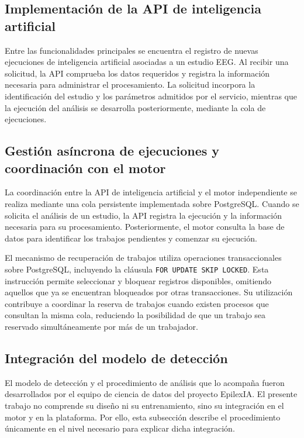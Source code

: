 \subsection{Implementación de la API de inteligencia artificial}

Entre las funcionalidades principales se
encuentra el registro de nuevas ejecuciones
de inteligencia artificial asociadas a un
estudio EEG. Al recibir una solicitud, la API
comprueba los datos requeridos y registra
la información necesaria para administrar
el procesamiento. La solicitud incorpora
la identificación del estudio y los parámetros
admitidos por el servicio, mientras que
la ejecución del análisis se desarrolla
posteriormente, mediante la cola de ejecuciones.

\subsection{Gestión asíncrona de ejecuciones y coordinación con el motor}

La coordinación entre la API de inteligencia
artificial y el motor independiente se realiza
mediante una cola persistente implementada
sobre PostgreSQL. Cuando se solicita el análisis
de un estudio, la API registra la ejecución
y la información necesaria para su procesamiento.
Posteriormente, el motor consulta la base
de datos para identificar los trabajos
pendientes y comenzar su ejecución.

El mecanismo de recuperación de trabajos
utiliza operaciones transaccionales sobre
PostgreSQL, incluyendo la cláusula
\texttt{FOR UPDATE SKIP LOCKED}. Esta
instrucción permite seleccionar y bloquear
registros disponibles, omitiendo aquellos
que ya se encuentran bloqueados por otras
transacciones. Su utilización contribuye
a coordinar la reserva de trabajos cuando
existen procesos que consultan la misma
cola, reduciendo la posibilidad de que
un trabajo sea reservado simultáneamente
por más de un trabajador.

\subsection{Integración del modelo de detección}
\label{subsec:modelo-vigente-hgb}

El modelo de detección y el procedimiento de análisis que lo acompaña fueron desarrollados por el equipo de ciencia de datos del proyecto EpilexIA.
El presente trabajo no comprende su diseño ni su entrenamiento, sino su integración en el motor y en la plataforma.
Por ello, esta subsección describe el procedimiento únicamente en el nivel necesario para explicar dicha integración.

